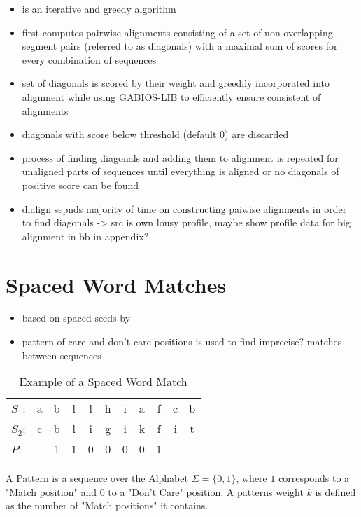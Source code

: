\begin{itemize}
	\item is an iterative and greedy algorithm
	\item first computes pairwise alignments  consisting of a set of non overlapping segment pairs (referred to as diagonals) with a maximal sum of scores for every combination of sequences
	\item set of diagonals is scored by their weight and greedily incorporated into alignment while using GABIOS-LIB to efficiently ensure consistent of alignments
	\item diagonals with score below threshold (default 0) are discarded
	\item process of finding diagonals and adding them to alignment is repeated for unaligned parts of sequences until everything is aligned or no diagonals of positive score can be found
	\item dialign sepnds majority of time on constructing paiwise alignments in order to find diagonals -> src is own lousy profile, maybe show profile data for big alignment in bb in appendix?
\end{itemize}



\section{Spaced Word Matches}

\begin{itemize}
	\item based on spaced seeds by \cite{ma2002patternhunter}
	\item pattern of care and don't care positions is used to find imprecise? matches between sequences 
\end{itemize}

\begin{table}[H]
	\centering
	\begin{tabular}{ l c c c c c c c c c c}
		$S_1$: & a&b&l&l&h&i&a&f&c&b \\ 
		$S_2$: & c&b&l&i&g&i&k&f&i&t \\  
		$P$: &    &1&1&0&0&0&0&1
	\end{tabular}
	\caption{Example of a Spaced Word Match}
	\label{tab:spaced-word}
\end{table}

\begin{mydef}
	A Pattern is a sequence over the Alphabet $\Sigma = \{0, 1\}$, where $1$ corresponds to a "Match position" and $0$ to a "Don't Care" position. A patterns weight $k$ is defined as the number of "Match positions" it contains.
\end{mydef}

